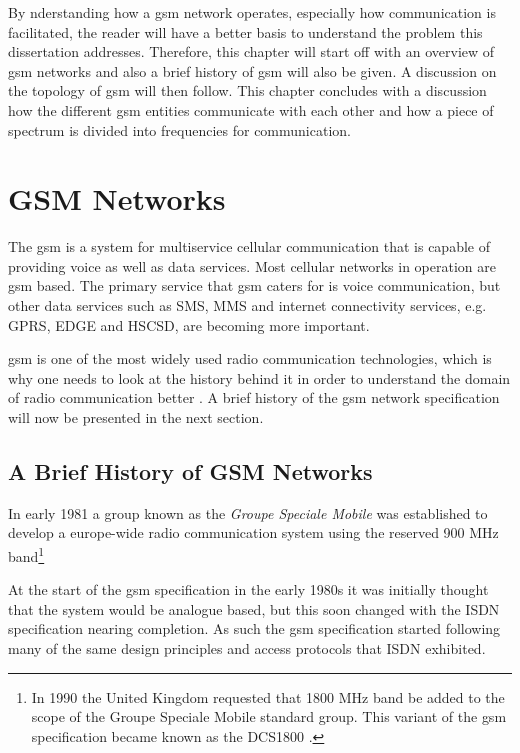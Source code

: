 By nderstanding how a \gls{gsm} network operates, especially how communication is facilitated, the reader will have a better basis to understand the problem this dissertation addresses. Therefore, this chapter will start off with an overview of \gls{gsm} networks and also a brief history of \gls{gsm} will also be given. A discussion on the topology of \gls{gsm} will then follow. This chapter concludes with a discussion how the different \gls{gsm} entities communicate with each other and how a piece of spectrum is divided into frequencies for communication.

\section{GSM Networks}
The \gls{gsm} is a system for multiservice cellular communication that is capable of providing voice as well as data services\cite{GSMArchitectureProtocolsServices,wirelesstelcoMullet}. Most cellular networks in operation are \gls{gsm} based\cite{Karen2004,wirelesstelcoMullet}. The primary service that \gls{gsm} caters for is voice communication, but other data services such as \gls{SMS}, \gls{MMS} and internet connectivity services, e.g. \gls{GPRS}, \gls{EDGE} and \gls{HSCSD}, are becoming more important\cite{GSMArchitectureProtocolsServices,Eisenblatter}.

\gls{gsm} is one of the most widely used radio communication technologies, which is why one needs to look at the history behind it in order to understand the domain of radio communication better \cite{GSMArchitectureProtocolsServices}. A brief history of the \gls{gsm} network specification will now be presented in the next section.

\subsection{A Brief History of GSM Networks}
\label{sec:gsmhistory}
In early 1981 a group known as the \emph{Groupe Speciale Mobile} was established to develop a europe-wide radio communication system using the reserved 900 MHz band\footnote{In 1990 the United Kingdom requested that 1800 MHz band be added to the scope of the Groupe Speciale Mobile standard group. This variant of the \gls{gsm} specification became known as the \gls{DCS1800} \cite{GSM92,Karen2004}.}

At the start of the \gls{gsm} specification in the early 1980s it was initially thought that the system would be analogue based, but this soon changed with the \gls{ISDN} specification nearing completion\cite{GSM92}. As such the \gls{gsm} specification started following many of the same design principles and access protocols that \gls{ISDN} exhibited\cite{GSM92}.

